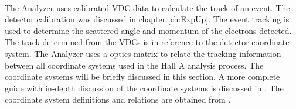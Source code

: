 \paragraph{}The Analyzer uses calibrated VDC data to calculate the track of an event. The detector calibration was discussed in chapter \ref{ch:ExpUp}. The event tracking is used to determine the scattered angle and momentum of the electrons detected. The track determined from the VDCs is in reference to the detector coordinate system. The Analyzer uses a optics matrix to relate the tracking information between all coordinate systems used in the Hall A analysis process. The coordinate systems will be briefly discussed in this section. A more complete guide with in-depth discussion of the coordinate systems is discussed in \cite{espace}. The coordinate system definitions and relations are obtained from \cite{espace,optics,HallA}.
